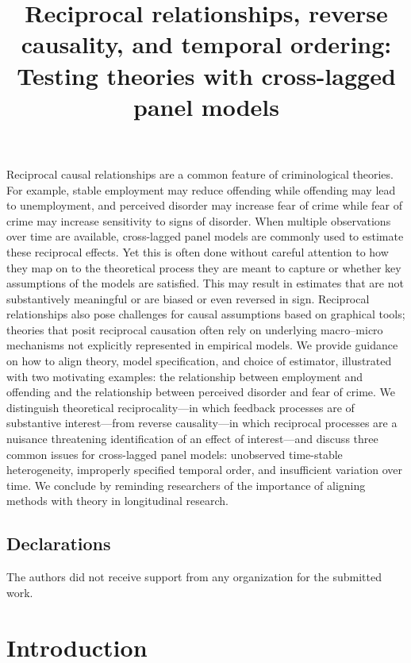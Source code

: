 \documentclass[
  letterpaper,
  DIV=11,
  numbers=noendperiod]{scrartcl}
\title{Reciprocal relationships, reverse causality, and temporal
ordering: Testing theories with cross-lagged panel models}
\author{}
\date{}
\begin{document}
\maketitle


Reciprocal causal relationships are a common feature of criminological
theories. For example, stable employment may reduce offending while
offending may lead to unemployment, and perceived disorder may increase
fear of crime while fear of crime may increase sensitivity to signs of
disorder. When multiple observations over time are available,
cross-lagged panel models are commonly used to estimate these reciprocal
effects. Yet this is often done without careful attention to how they
map on to the theoretical process they are meant to capture or whether
key assumptions of the models are satisfied. This may result in
estimates that are not substantively meaningful or are biased or even
reversed in sign. Reciprocal relationships also pose challenges for
causal assumptions based on graphical tools; theories that posit
reciprocal causation often rely on underlying macro--micro mechanisms
not explicitly represented in empirical models. We provide guidance on
how to align theory, model specification, and choice of estimator,
illustrated with two motivating examples: the relationship between
employment and offending and the relationship between perceived disorder
and fear of crime. We distinguish theoretical reciprocality---in which
feedback processes are of substantive interest---from reverse
causality---in which reciprocal processes are a nuisance threatening
identification of an effect of interest---and discuss three common
issues for cross-lagged panel models: unobserved time-stable
heterogeneity, improperly specified temporal order, and insufficient
variation over time. We conclude by reminding researchers of the
importance of aligning methods with theory in longitudinal research.

\subsection{Declarations}\label{declarations}

The authors did not receive support from any organization for the
submitted work.

\section{Introduction}\label{introduction}
\end{document}
